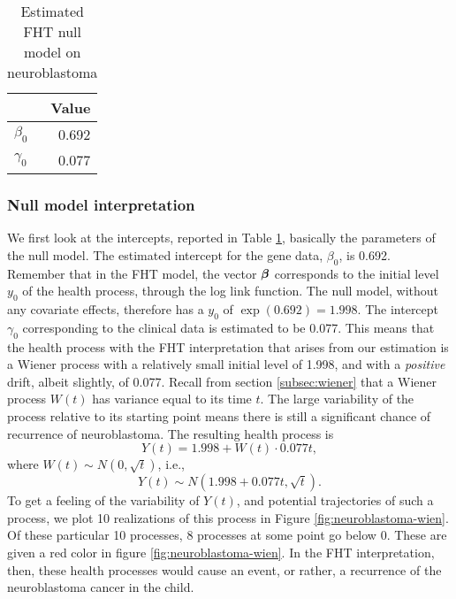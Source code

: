 \begin{table}
\caption{Estimated FHT null model on neuroblastoma \citep{oberthuer-data}}
\label{tab:neuroblastoma-intercepts}
\centering
\begin{tabular}{lr}
\toprule
  & Value\\
\hline
$\beta_0$ & 0.692 \\
$\gamma_0$ & 0.077 \\
\bottomrule
\end{tabular}
\end{table}

\subsubsection{Null model interpretation}
We first look at the intercepts, reported in Table \ref{tab:neuroblastoma-intercepts}, basically the parameters of the null model.
The estimated intercept for the gene data, $\beta_0$, is 0.692.
Remember that in the FHT model, the vector $\boldsymbol{\beta}$ corresponds to the initial level $y_0$ of the health process, through the log link function.
The null model, without any covariate effects, therefore has a $y_0$ of $\exp(0.692)=1.998$.
The intercept $\gamma_0$ corresponding to the clinical data is estimated to be 0.077.
This means that the health process with the FHT interpretation that arises from our estimation is a Wiener process with a relatively small initial level of 1.998, and with a \textit{positive} drift, albeit slightly, of 0.077.
Recall from section \ref{subsec:wiener} that a Wiener process $W(t)$ has variance equal to its time $t$.
The large variability of the process relative to its starting point means there is still a significant chance of recurrence of neuroblastoma.
The resulting health process is
\begin{equation*}
    Y(t)=1.998+W(t)\cdot0.077t,
\end{equation*}
where $W(t)\sim N(0,\sqrt{t})$,
i.e.,
\begin{equation*}
    Y(t)\sim N(1.998+0.077t,\sqrt{t}).
\end{equation*}
To get a feeling of the variability of $Y(t)$, and potential trajectories of such a process, we plot 10 realizations of this process in Figure \ref{fig:neuroblastoma-wien}.
Of these particular 10 processes, 8 processes at some point go below 0.
These are given a red color in figure \ref{fig:neuroblastoma-wien}.
In the FHT interpretation, then, these health processes would cause an event, or rather, a recurrence of the neuroblastoma cancer in the child.
